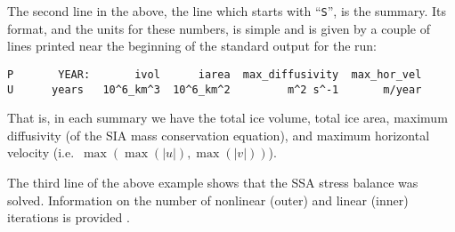 The second line in the above, the line which starts with ``\texttt{S}'', is the summary.  Its format, and the units for these numbers, is simple and is given by a couple of lines printed near the beginning of the standard output for the run:
\small
\begin{verbatim}
P       YEAR:       ivol      iarea  max_diffusivity  max_hor_vel
U      years   10^6_km^3  10^6_km^2         m^2 s^-1       m/year
\end{verbatim}
\normalsize
That is, in each summary we have the total ice volume, total ice area, maximum diffusivity (of the SIA mass conservation equation), and maximum horizontal velocity (i.e.~$\max(\max(|u|), \max(|v|))$).

The third line of the above example shows that the SSA stress balance was solved.  Information on the number of nonlinear (outer) and linear (inner) iterations is provided \cite{BBssasliding}.

